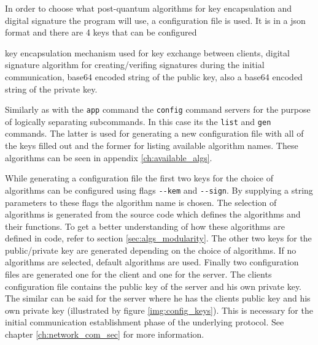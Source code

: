 In order to choose what post-quantum algorithms for key encapsulation and digital signature the program will use, a configuration file is used. It is in a json format and there are 4 keys that can be configured
\begin{itemize}
  key encapsulation mechanism used for key exchange between clients,
  digital signature algorithm for creating/verifing signatures during the initial communication,
  base64 encoded string of the public key,
  also a base64 encoded string of the private key.
\end{itemize}
Similarly as with the \texttt{app} command the \texttt{config} command servers for the purpose of logically separating subcommands. In this case its the \texttt{list} and \texttt{gen} commands. The latter is used for generating a new configuration file with all of the keys filled out and the former for listing available algorithm names. These algorithms can be seen in appendix \ref{ch:available_algs}.

While generating a configuration file the first two keys for the choice of algorithms can be configured using flags \texttt{-\--kem} and \texttt{-\--sign}. By supplying a string parameters to these flags the algorithm name is chosen. The selection of algorithms is generated from the source code which defines the algorithms and their functions. To get a better understanding of how these algorithms are defined in code, refer to section \ref{sec:algs_modularity}. The other two keys for the public/private key are generated depending on the choice of algorithms. If no algorithms are selected, default algorithms are used. Finally two configuration files are generated one for the client and one for the server. The clients configuration file contains the public key of the server and his own private key. The similar can be said for the server where he has the clients public key and his own private key (illustrated by figure \ref{img:config_keys}). This is necessary for the initial communication establishment phase of the underlying protocol. See chapter \ref{ch:network_com_sec} for more information.
